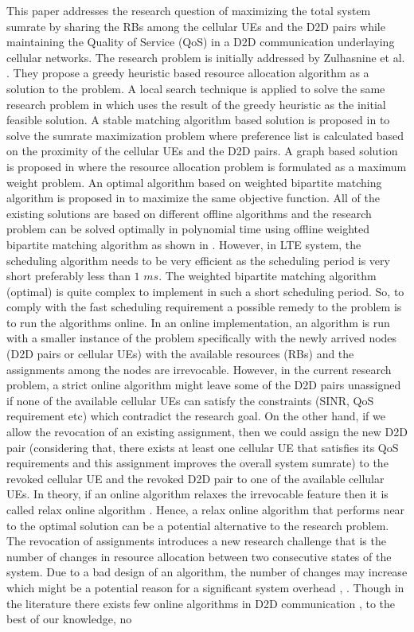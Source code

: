 \documentclass[times]{dacauth}
\begin{document}
\smallskip
\noindent 
This paper addresses the research question of maximizing the total system sumrate by sharing the RBs among the cellular UEs and the D2D  pairs while maintaining the Quality of Service (QoS) in a D2D communication underlaying cellular networks. The research problem is initially addressed by Zulhasnine et al. \cite{zulhasnine}. They propose a greedy heuristic based resource allocation algorithm as a solution to the problem. A local search technique is applied to solve the same research problem in \cite{lora} which uses the result of the greedy heuristic \cite{zulhasnine} as the initial feasible solution. A stable matching algorithm \cite{kleinberg2011algorithm} based solution is proposed in \cite{dara} to solve the sumrate maximization problem where preference list is calculated based on the proximity of the cellular UEs and the D2D pairs. A graph based solution is proposed in \cite{zhang} where the resource allocation problem is formulated as a maximum weight problem. An optimal algorithm based on weighted bipartite matching algorithm is proposed in \cite{ccnc} to maximize the same objective function. All of the existing solutions are based on different offline algorithms and the research problem can be solved optimally in polynomial time using offline weighted bipartite matching algorithm as shown in \cite{ccnc}. However, in LTE system, the scheduling algorithm needs to be very efficient as the scheduling period is very short preferably less than $1$ $ms$. The weighted bipartite matching algorithm (optimal) is quite complex to implement in such a short scheduling period. So, to comply with the fast scheduling requirement a possible remedy to the problem is to run the algorithms online. In an online implementation, an algorithm is run with a smaller instance of the problem specifically with the newly arrived nodes (D2D pairs or cellular UEs) with the available resources (RBs) and the assignments among the nodes are irrevocable. However, in the current research problem, a strict online algorithm might leave some of the D2D pairs unassigned if none of the available cellular UEs can satisfy the constraints (SINR, QoS requirement etc) which contradict the research goal. On the other hand, if we allow the revocation of an existing assignment, then we could assign the new D2D pair (considering that, there exists at least one cellular UE that satisfies its QoS requirements and this assignment improves the overall system sumrate) to the revoked cellular UE and the revoked D2D pair to  one of the available cellular UEs. In theory, if an online algorithm relaxes the irrevocable feature then it is called relax online algorithm \cite {relax}. Hence, a relax online algorithm that performs near to the optimal solution can be a potential alternative to the research problem. The revocation of assignments introduces a new research challenge that is the number of changes in resource allocation between two consecutive states of the system. Due to a bad design of an algorithm, the number of changes may increase which might be a potential reason for a significant system overhead \cite{asadi2014survey}, \cite{seidel20133gpp}. Though in the literature there exists few online algorithms in D2D communication \cite{onlined2d}, \cite{xu2014dynamic} to the best of our knowledge, no 
\end{document}
